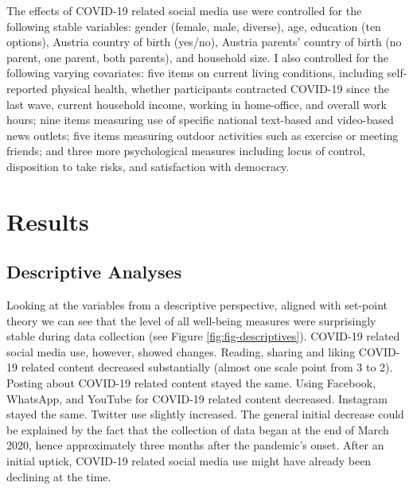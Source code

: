 \documentclass[
  man,mask,floatsintext]{apa7}
\begin{document}
The effects of COVID-19 related social media use were controlled for the following stable variables:
gender (female, male, diverse), age, education (ten options), Austria country of birth (yes/no), Austria parents' country of birth (no parent, one parent, both parents), and household size.
I also controlled for the following varying covariates: five items on current living conditions, including self-reported physical health, whether participants contracted COVID-19 since the last wave, current household income, working in home-office, and overall work hours; nine items measuring use of specific national text-based and video-based news outlets; five items measuring outdoor activities such as exercise or meeting friends; and three more psychological measures including locus of control, disposition to take risks, and satisfaction with democracy.

\hypertarget{results}{%
\section{Results}\label{results}}

\hypertarget{descriptive-analyses}{%
\subsection{Descriptive Analyses}\label{descriptive-analyses}}

Looking at the variables from a descriptive perspective, aligned with set-point theory we can see that the level of all well-being measures were surprisingly stable during data collection (see Figure \ref{fig:fig-descriptives}).
COVID-19 related social media use, however, showed changes.
Reading, sharing and liking COVID-19 related content decreased substantially (almost one scale point from 3 to 2).
Posting about COVID-19 related content stayed the same.
Using Facebook, WhatsApp, and YouTube for COVID-19 related content decreased.
Instagram stayed the same.
Twitter use slightly increased.
The general initial decrease could be explained by the fact that the collection of data began at the end of March 2020, hence approximately three months after the pandemic's onset.
After an initial uptick, COVID-19 related social media use might have already been declining at the time.
\end{document}
